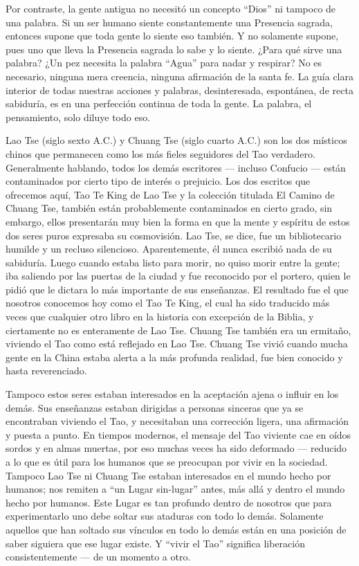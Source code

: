 \documentclass[book,b5paper,hidelinks,final]{memoir}
\begin{document}
	Por contraste, la gente antigua no necesitó un concepto ``Dios'' ni
	tampoco de una palabra. Si un ser humano siente constantemente una
	Presencia sagrada, entonces supone que toda gente lo siente eso también.
	Y no solamente supone, pues uno que lleva la Presencia sagrada lo sabe y
	lo siente. ¿Para qué sirve una palabra? ¿Un pez necesita la palabra
	``Agua'' para nadar y respirar? No es necesario, ninguna mera creencia,
	ninguna afirmación de la santa fe. La guía clara interior de todas
	nuestras acciones y palabras, desinteresada, espontánea, de recta
	sabiduría, es en una perfección continua de toda la gente. La palabra,
	el pensamiento, solo diluye todo eso.
	
	Lao Tse (siglo sexto A.C.) y Chuang Tse (siglo cuarto A.C.) son los dos
	místicos chinos que permanecen como los más fieles seguidores del Tao
	verdadero. Generalmente hablando, todos los demás escritores --- incluso
	Confucio --- están contaminados por cierto tipo de interés o prejuicio.
	Los dos escritos que ofrecemos aquí, Tao Te King de Lao Tse y la
	colección titulada El Camino de Chuang Tse, también están probablemente
	contaminados en cierto grado, sin embargo, ellos presentarán muy bien la
	forma en que la mente y espíritu de estos dos seres puros expresaba su
	cosmovisión. Lao Tse, se dice, fue un bibliotecario humilde y un recluso
	silencioso. Aparentemente, él nunca escribió nada de su sabiduría. Luego
	cuando estaba listo para morir, no quiso morir entre la gente; iba
	saliendo por las puertas de la ciudad y fue reconocido por el portero,
	quien le pidió que le dictara lo más importante de sus enseñanzas. El
	resultado fue el que nosotros conocemos hoy como el Tao Te King, el cual
	ha sido traducido más veces que cualquier otro libro en la historia con
	excepción de la Biblia, y ciertamente no es enteramente de Lao Tse.
	Chuang Tse también era un ermitaño, viviendo el Tao como está reflejado
	en Lao Tse. Chuang Tse vivió cuando mucha gente en la China estaba
	alerta a la más profunda realidad, fue bien conocido y hasta
	reverenciado.
	
	Tampoco estos seres estaban interesados en la aceptación ajena o influir
	en los demás. Sus enseñanzas estaban dirigidas a personas sinceras que
	ya se encontraban viviendo el Tao, y necesitaban una corrección ligera,
	una afirmación y puesta a punto. En tiempos modernos, el mensaje del Tao
	viviente cae en oídos sordos y en almas muertas, por eso muchas veces ha
	sido deformado --- reducido a lo que es útil para los humanos que se
	preocupan por vivir en la sociedad. Tampoco Lao Tse ni Chuang Tse
	estaban interesados en el mundo hecho por humanos; nos remiten a ``un
	Lugar sin-lugar'' antes, más allá y dentro el mundo hecho por humanos.
	Este Lugar es tan profundo dentro de nosotros que para experimentarlo
	uno debe soltar sus ataduras con todo lo demás. Solamente aquellos que
	han soltado sus vínculos en todo lo demás están en una posición de saber
	siguiera que ese lugar existe. Y ``vivir el Tao'' significa liberación
	consistentemente --- de un momento a otro.
	
\end{document}
